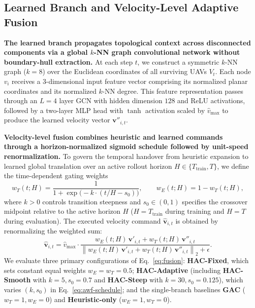 \documentclass[11pt]{article}
\theoremstyle{plain}
\theoremstyle{definition}
\theoremstyle{remark}
\begin{document}
\subsection{Learned Branch and Velocity-Level Adaptive Fusion}
\label{sec:learned-branch}
\label{sec:fusion}
\textbf{The learned branch propagates topological context across disconnected components via a global $k$-NN graph convolutional network without boundary-hull extraction.} At each step $t$, we construct a symmetric $k$-NN graph ($k=8$) over the Euclidean coordinates of all surviving UAVs $V_t$. Each node $v_i$ receives a $3$-dimensional input feature vector comprising its normalized planar coordinates and its normalized $k$-NN degree. This feature representation passes through an $L=4$ layer GCN with hidden dimension $128$ and ReLU activations, followed by a two-layer MLP head with $\tanh$ activation scaled by $\hat{v}_{\max}$ to produce the learned velocity vector $\mathbf{v}''_{i,t}$.

\textbf{Velocity-level fusion combines heuristic and learned commands through a horizon-normalized sigmoid schedule followed by unit-speed renormalization.} To govern the temporal handover from heuristic expansion to learned global translation over an active rollout horizon $H \in \{T_{\mathrm{train}}, T\}$, we define the time-dependent gating weights
\begin{equation}
  w_T(t; H) = \frac{1}{1 + \exp\bigl(-k \cdot (t/H - s_0)\bigr)}, \qquad w_E(t; H) = 1 - w_T(t; H),
  \label{eq:awf-schedule}
\end{equation}
where $k > 0$ controls transition steepness and $s_0 \in (0, 1)$ specifies the crossover midpoint relative to the active horizon $H$ ($H = T_{\mathrm{train}}$ during training and $H = T$ during evaluation). The executed velocity command $\hat{\mathbf{v}}_{i,t}$ is obtained by renormalizing the weighted sum:
\begin{equation}
  \hat{\mathbf{v}}_{i,t} = \hat{v}_{\max} \cdot
  \frac{w_E(t; H)\,\mathbf{v}'_{i,t} + w_T(t; H)\,\mathbf{v}''_{i,t}}
       {\left\| w_E(t; H)\,\mathbf{v}'_{i,t} + w_T(t; H)\,\mathbf{v}''_{i,t} \right\|_2 + \epsilon}.
  \label{eq:fusion}
\end{equation}
We evaluate three primary configurations of Eq.~\eqref{eq:fusion}: \textbf{HAC-Fixed}, which sets constant equal weights $w_E = w_T = 0.5$; \textbf{HAC-Adaptive} (including \textbf{HAC-Smooth} with $k=5, s_0=0.7$ and \textbf{HAC-Steep} with $k=30, s_0=0.125$), which varies $(k, s_0)$ in Eq.~\eqref{eq:awf-schedule}; and the single-branch baselines \textbf{GAC} ($w_T = 1, w_E = 0$) and \textbf{Heuristic-only} ($w_E = 1, w_T = 0$).
\end{document}
